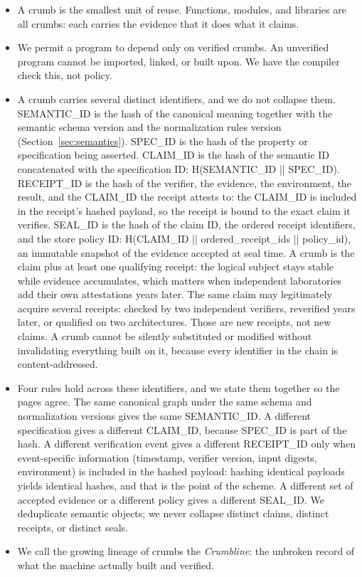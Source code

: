 \documentclass[11pt]{article}
\begin{document}
\begin{itemize}
\item A crumb is the smallest unit of reuse. Functions, modules, and
libraries are all crumbs: each carries the evidence that it does what it
claims.
\item We permit a program to depend only on verified crumbs. An unverified
program cannot be imported, linked, or built upon. We have the compiler
check this, not policy.
\item A crumb carries several distinct identifiers, and we do not collapse
them. SEMANTIC\_ID is the hash of the canonical meaning together with
the semantic schema version and the normalization rules version
(Section~\ref{sec:semantics}). SPEC\_ID is the
hash of the property or specification being asserted. CLAIM\_ID is the hash
of the semantic ID concatenated with the specification ID:
H(SEMANTIC\_ID || SPEC\_ID). RECEIPT\_ID is the hash of the verifier, the
evidence, the environment, the result, and the CLAIM\_ID the receipt
attests to: the CLAIM\_ID is included in the receipt's hashed payload, so
the receipt is bound to the exact claim it verifies. SEAL\_ID is the hash of the claim ID, the ordered receipt
identifiers, and the store policy ID: H(CLAIM\_ID || ordered\_receipt\_ids
|| policy\_id), an immutable snapshot of the evidence accepted at seal
time. A crumb is the claim plus at least one qualifying receipt: the
logical subject stays stable while evidence accumulates, which matters
when independent laboratories add their own attestations years later. The
same claim may legitimately acquire several receipts: checked by two
independent verifiers, reverified years later, or qualified on two
architectures. Those are new receipts, not new claims. A crumb cannot be
silently substituted or modified without invalidating everything built on
it, because every identifier in the chain is content-addressed.
\item Four rules hold across these identifiers, and we state them together
so the pages agree. The same canonical graph under the same schema and
normalization versions gives the same SEMANTIC\_ID. A different
specification gives a different CLAIM\_ID, because SPEC\_ID is part of
the hash. A different verification event gives a different RECEIPT\_ID
only when event-specific information (timestamp, verifier version, input
digests, environment) is included in the hashed payload: hashing
identical payloads yields identical hashes, and that is the point of the
scheme. A different set of accepted evidence or a different policy gives a
different SEAL\_ID. We deduplicate semantic objects; we never collapse
distinct claims, distinct receipts, or distinct seals.
\item We call the growing lineage of crumbs the \emph{Crumbline}: the
unbroken record of what the machine actually built and verified.
\end{itemize}
\end{document}
